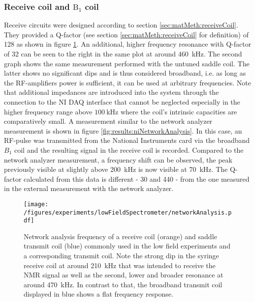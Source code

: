         \subsubsection{Receive coil and $\mathrm{B_1}$ coil}
        \label{sec:results:receiveCoil}
        Receive circuits were designed according to section \ref{sec:matMeth:receiveCoil}. They provided a Q-factor (see section \ref{sec:matMeth:receiveCoil} for definition) of 128 as shown in figure \ref{fig:results:networkAnalysis}.  An additional, higher frequency resonance with Q-factor of 32 can be seen to the right in the same plot at around \SI{460}{\kilo Hz}. The second graph shows the same measurement performed with the untuned saddle coil. The latter shows no significant dips and is thus considered broadband, i.e. as long as the RF-amplifiers power is sufficient, it can be used at arbitrary frequencies. Note that additional impedances are introduced into the system through the connection to the NI DAQ interface that cannot be neglected especially in the higher frequency range above $\SI{100}{\kilo\hertz}$ where the coil's intrinsic capacities are comparatively small. A measurement similar to the network analyzer measurement is shown in figure \ref{fig:results:niNetworkAnalysis}. In this case, an RF-pulse was transmitted from the National Instruments card via the broadband $B_1$ coil and the resulting signal in the receive coil is recorded. Compared to the network analyzer measurement, a frequency shift can be observed, the peak previously visible at slightly above \SI{200}{\kilo\hertz} is now visible at \SI{70}{\kilo\hertz}. The Q-factor calculated from this data is different - 30 and 440 - from the one measured in the external measurement with the network analyzer.
            \begin{figure}
                \centering
                \texttt{[image: /figures/experiments/lowFieldSpectrometer/networkAnalysis.pdf]}
                \caption[Network analysis receive coil]{Network analysis frequency of a receive coil (orange) and saddle transmit coil (blue) commonly used in the low field experiments and a corresponding transmit coil. Note the strong dip in the syringe receive coil at around \SI{210}{\kilo\hertz} that was intended to receive the NMR signal as well as the second, lower and broader resonance at around \SI{470}{\kilo\hertz}. In contrast to that, the broadband transmit coil displayed in blue shows a flat frequency response.}
                \label{fig:results:networkAnalysis}
            \end{figure}
